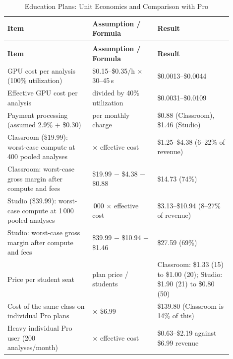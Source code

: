 \documentclass[a4paper]{article}
\begin{document}
\begin{longtable}{@{}
    >{\raggedright\arraybackslash}p{0.34\linewidth}
    >{\raggedright\arraybackslash}p{0.26\linewidth}
    >{\raggedright\arraybackslash}p{0.30\linewidth}@{}}

    \caption{Education Plans: Unit Economics and Comparison with Pro}\label{tab:edu_economics} \\
    \toprule
    \textbf{Item} & \textbf{Assumption / Formula} & \textbf{Result} \\
    \midrule
    \endfirsthead
    \multicolumn{3}{l}{\footnotesize\itshape (Table~\ref{tab:edu_economics} continued)}\\
    \toprule
    \textbf{Item} & \textbf{Assumption / Formula} & \textbf{Result} \\
    \midrule
    \endhead
    \bottomrule
    \endlastfoot

    GPU cost per analysis (100\% utilization) & \$0.15--\$0.35/h $\times$ 30--45\,s & \$0.0013--\$0.0044 \\
    \addlinespace
    Effective GPU cost per analysis & divided by 40\% utilization & \$0.0031--\$0.0109 \\
    \addlinespace
    Payment processing (assumed 2.9\% + \$0.30) & per monthly charge & \$0.88 (Classroom), \$1.46 (Studio) \\
    \addlinespace
    Classroom (\$19.99): worst-case compute at 400 pooled analyses & 400 $\times$ effective cost & \$1.25--\$4.38 (6--22\% of revenue) \\
    \addlinespace
    Classroom: worst-case gross margin after compute and fees & \$19.99 $-$ \$4.38 $-$ \$0.88 & \$14.73 (74\%) \\
    \addlinespace
    Studio (\$39.99): worst-case compute at 1\,000 pooled analyses & 1\,000 $\times$ effective cost & \$3.13--\$10.94 (8--27\% of revenue) \\
    \addlinespace
    Studio: worst-case gross margin after compute and fees & \$39.99 $-$ \$10.94 $-$ \$1.46 & \$27.59 (69\%) \\
    \addlinespace
    Price per student seat & plan price / students & Classroom: \$1.33 (15) to \$1.00 (20); Studio: \$1.90 (21) to \$0.80 (50) \\
    \addlinespace
    Cost of the same class on individual Pro plans & 20 $\times$ \$6.99 & \$139.80 (Classroom is 14\% of this) \\
    \addlinespace
    Heavy individual Pro user (200 analyses/month) & 200 $\times$ effective cost & \$0.63--\$2.19 against \$6.99 revenue \\
\end{longtable}
\end{document}
